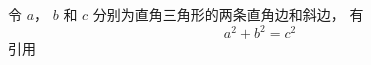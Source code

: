 
令 $a$， $b$ 和 $c$ 分别为直角三角形的两条直角边和斜边， 有
\begin{equation}\label{test_eq1}
a^2 + b^2 = c^2
\end{equation}
引用

